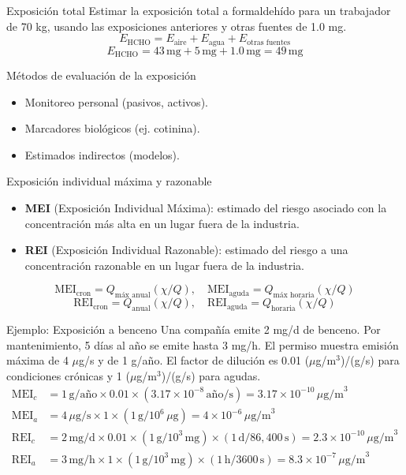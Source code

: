 \documentclass[10pt,compress]{beamer}
\begin{document}
\begin{frame}{Exposición total}
Estimar la exposición total a formaldehído para un trabajador de 70 kg, usando las exposiciones anteriores y otras fuentes de 1.0 mg.
\[
E_{\text{HCHO}} = E_{\text{aire}} + E_{\text{agua}} + E_{\text{otras fuentes}}
\]
\[
E_{\text{HCHO}} = 43 \, \text{mg} + 5 \, \text{mg} + 1.0 \, \text{mg} = 49 \, \text{mg}
\]
\end{frame}

\begin{frame}{Métodos de evaluación de la exposición}
\begin{itemize}
\item Monitoreo personal (pasivos, activos).
\item Marcadores biológicos (ej. cotinina).
\item Estimados indirectos (modelos).
\end{itemize}
\end{frame}

\begin{frame}{Exposición individual máxima y razonable}
\begin{itemize}
\item \textbf{MEI} (Exposición Individual Máxima): estimado del riesgo asociado con la concentración más alta en un lugar fuera de la industria.
\item \textbf{REI} (Exposición Individual Razonable): estimado del riesgo a una concentración razonable en un lugar fuera de la industria.
\end{itemize}
\[
\text{MEI}_{\text{cron}} = Q_{\text{máx anual}} (\chi/Q), \quad \text{MEI}_{\text{aguda}} = Q_{\text{máx horaria}} (\chi/Q)
\]
\[
\text{REI}_{\text{cron}} = Q_{\text{anual}} (\chi/Q), \quad \text{REI}_{\text{aguda}} = Q_{\text{horaria}} (\chi/Q)
\]
\end{frame}

\begin{frame}{Ejemplo: Exposición a benceno}
Una compañía emite 2 mg/d de benceno. Por mantenimiento, 5 días al año se emite hasta 3 mg/h. El permiso muestra emisión máxima de 4 $\mu$g/s y de 1 g/año. El factor de dilución es 0.01 ($\mu$g/m$^3$)/(g/s) para condiciones crónicas y 1 ($\mu$g/m$^3$)/(g/s) para agudas.
\begin{align*}
\text{MEI}_c &= 1 \, \text{g/año} \times 0.01 \times (3.17\times10^{-8} \, \text{año/s}) = 3.17\times10^{-10} \, \mu\text{g/m}^3 \\
\text{MEI}_a &= 4 \, \mu\text{g/s} \times 1 \times (1 \, \text{g}/10^6 \, \mu\text{g}) = 4\times10^{-6} \, \mu\text{g/m}^3 \\
\text{REI}_c &= 2 \, \text{mg/d} \times 0.01 \times (1 \, \text{g}/10^3 \, \text{mg}) \times (1 \, \text{d}/86,400 \, \text{s}) = 2.3\times10^{-10} \, \mu\text{g/m}^3 \\
\text{REI}_a &= 3 \, \text{mg/h} \times 1 \times (1 \, \text{g}/10^3 \, \text{mg}) \times (1 \, \text{h}/3600 \, \text{s}) = 8.3\times10^{-7} \, \mu\text{g/m}^3
\end{align*}
\end{frame}
\end{document}
